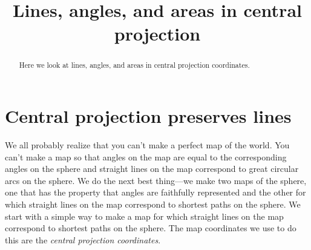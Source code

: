 \documentclass{ximera}
\title{Lines, angles, and areas in central projection}
\begin{document}
\begin{abstract}
  Here we look at lines, angles, and areas in central projection coordinates. 
\end{abstract}
\maketitle

\section{Central projection preserves lines}

We all probably realize that you can't make a perfect map of the
world. You can't make a map so that angles on the map are equal to the
corresponding angles on the sphere and straight lines on the map
correspond to great circular arcs on the sphere. We do the next best
thing---we make two maps of the sphere, one that has the property that
angles are faithfully represented and the other for which straight
lines on the map correspond to shortest paths on the sphere. We start
with a simple way to make a map for which straight lines on the map
correspond to shortest paths on the sphere.  The map coordinates we
use to do this are the \textit{central projection coordinates}.
\end{document}
